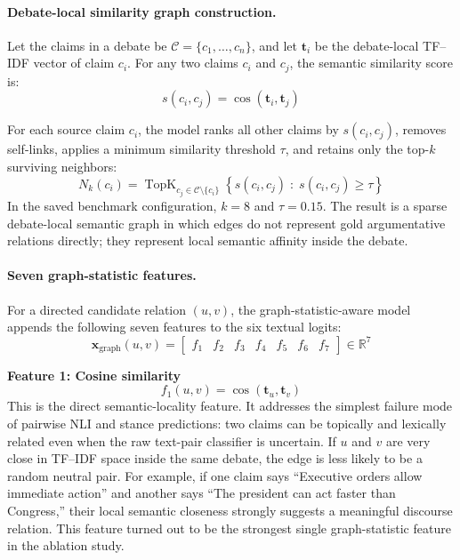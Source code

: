 \documentclass[11pt,a4paper]{article}
\begin{document}
\paragraph{Debate-local similarity graph construction.}
Let the claims in a debate be \(\mathcal{C} = \{c_1,\dots,c_n\}\), and let \(\mathbf{t}_i\) be the debate-local
TF--IDF vector of claim \(c_i\). For any two claims \(c_i\) and \(c_j\), the semantic similarity score is:
\begin{equation}
s(c_i,c_j) = \cos(\mathbf{t}_i,\mathbf{t}_j)
\end{equation}

For each source claim \(c_i\), the model ranks all other claims by \(s(c_i,c_j)\), removes self-links, applies a
minimum similarity threshold \(\tau\), and retains only the top-\(k\) surviving neighbors:
\begin{equation}
N_k(c_i) = \operatorname{TopK}_{c_j \in \mathcal{C}\setminus \{c_i\}} \left\{ s(c_i,c_j) \; : \; s(c_i,c_j)\ge \tau \right\}
\end{equation}
In the saved benchmark configuration, \(k=8\) and \(\tau=0.15\). The result is a sparse debate-local semantic graph in
which edges do not represent gold argumentative relations directly; they represent local semantic affinity inside the
debate.

\paragraph{Seven graph-statistic features.}
For a directed candidate relation \((u,v)\), the graph-statistic-aware model appends the following seven features to
the six textual logits:
\begin{equation}
\mathbf{x}_{\mathrm{graph}}(u,v) =
\begin{bmatrix}
f_1 & f_2 & f_3 & f_4 & f_5 & f_6 & f_7
\end{bmatrix}
\in \mathbb{R}^{7}
\end{equation}

\textbf{Feature 1: Cosine similarity}
\begin{equation}
f_1(u,v) = \cos(\mathbf{t}_u,\mathbf{t}_v)
\end{equation}
This is the direct semantic-locality feature. It addresses the simplest failure mode of pairwise NLI and stance
predictions: two claims can be topically and lexically related even when the raw text-pair classifier is uncertain. If
\(u\) and \(v\) are very close in TF--IDF space inside the same debate, the edge is less likely to be a random neutral
pair. For example, if one claim says ``Executive orders allow immediate action'' and another says ``The president can
act faster than Congress,'' their local semantic closeness strongly suggests a meaningful discourse relation. This
feature turned out to be the strongest single graph-statistic feature in the ablation study.
\end{document}
